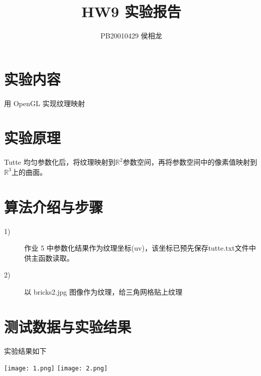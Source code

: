 \documentclass{article}
\title{HW9 实验报告}
\author{PB20010429 侯相龙}
\begin{document}
\maketitle
\section{实验内容}
用 OpenGL 实现纹理映射

\section{实验原理}

Tutte 均匀参数化后，将纹理映射到$\mathbb{R}^2$参数空间，再将参数空间中的像素值映射到$\mathbb{R}^3$上的曲面。

\section{算法介绍与步骤}
\begin{description}
    \item[1)]作业 5 中参数化结果作为纹理坐标(uv)，该坐标已预先保存tutte.txt文件中供主函数读取。
    \item[2)]以 bricks2.jpg 图像作为纹理，给三角网格贴上纹理
\end{description}


\section{测试数据与实验结果}
实验结果如下

\texttt{[image: 1.png]}
\qquad
\texttt{[image: 2.png]}
\end{document}
